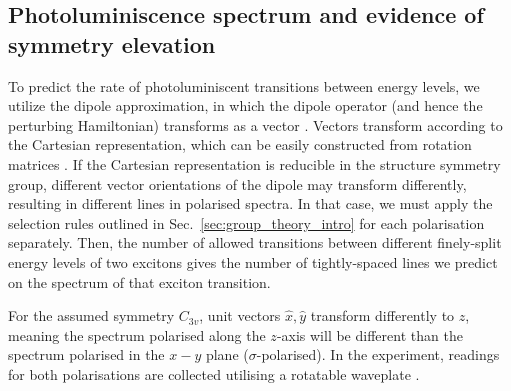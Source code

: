 \subsection[Photoluminiscence spectrum]{Photoluminiscence spectrum and evidence of symmetry elevation}

To predict the rate of photoluminiscent transitions between energy levels, we utilize the dipole approximation, in which the dipole operator (and hence the perturbing Hamiltonian) transforms as a vector \cite[p.~13]{karlsson}. Vectors transform according to the Cartesian representation, which can be easily constructed from rotation matrices \cite[p.~160]{wigner}. If the Cartesian representation is reducible in the structure symmetry group, different vector orientations of the dipole may transform differently, resulting in different lines in polarised spectra. In that case, we must apply the selection rules outlined in Sec.~\ref{sec:group_theory_intro} for each polarisation separately. Then, the number of allowed transitions between different finely-split energy levels of two excitons gives the number of tightly-spaced lines we predict on the spectrum of that exciton transition.

For the assumed symmetry $C_{3v}$, unit vectors $\hat{x},\hat{y}$ transform differently to $\hat{z}$, meaning the spectrum polarised along the $z$-axis will be different than the spectrum polarised in the $x-y$ plane ($\sigma$-polarised). In the experiment, readings for both polarisations are collected utilising a rotatable waveplate \cite[p.~2]{karlsson}.

